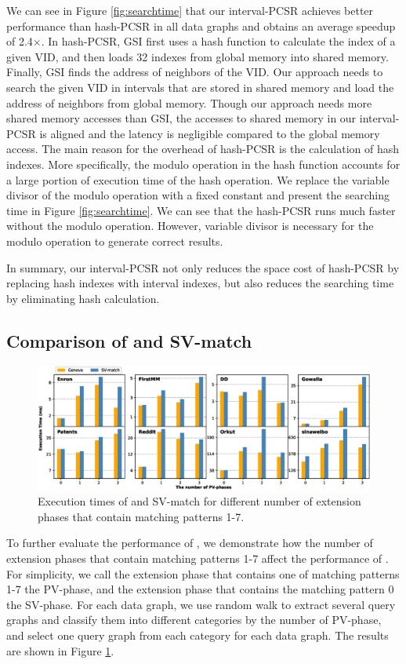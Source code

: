 We can see in Figure \ref{fig:searchtime} that our interval-PCSR achieves better performance than hash-PCSR in all data graphs and obtains
an average speedup of 2.4$\times$. In hash-PCSR, GSI first uses a hash function to calculate the index of a given VID, and then loads 32
indexes from global memory into shared memory. Finally, GSI finds the address of neighbors of the VID. Our approach needs to search the
given VID in intervals that are stored in shared memory and load the address of neighbors from global memory. Though our approach needs
more shared memory accesses than GSI, the accesses to shared memory in our interval-PCSR is aligned and the latency is negligible compared
to the global memory access. The main reason for the overhead of hash-PCSR is the calculation of hash indexes. More specifically, the
modulo operation in the hash function accounts for a large portion of execution time of the hash operation. We replace the variable divisor
of the modulo operation with a fixed constant and present the searching time in Figure \ref{fig:searchtime}. We can see that the hash-PCSR
runs much faster without the modulo operation. However, variable divisor is necessary for the modulo operation to generate correct results.

In summary, our interval-PCSR not only reduces the space cost of hash-PCSR by replacing hash indexes with interval indexes, but also
reduces the searching time by eliminating hash calculation.


\subsection{Comparison of \SystemName and SV-match} \label{sec:comparesv}
\begin{figure}
\centering
\includegraphics[width=\textwidth]{./figure/compareSV.eps}
\caption{Execution times of \SystemName and SV-match for different number of extension phases that contain matching patterns 1-7.}	
\label{fig:compareSV}
\end{figure}
To further evaluate the performance of \SystemName, we demonstrate how the number of extension phases that contain matching patterns 1-7 affect the performance of \SystemName. For simplicity, we call the extension phase that contains one of matching patterns 1-7 the PV-phase, and the extension phase that contains the matching pattern 0 the SV-phase. For each data graph, we use random walk to extract several query graphs and classify them into different categories by the number of PV-phase, and select one query graph from each category for each data graph. The results are shown in Figure \ref{fig:compareSV}.

